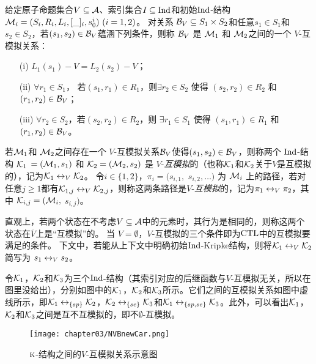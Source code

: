 \begin{definition}[$V$-互模拟]
	\label{def:VInd:bisimulation}
	给定原子命题集合$V\subseteq\cal A$、索引集合$I\subseteq \textrm{Ind}$和初始$\textrm{Ind}$-结构 ${\cal M}_i=(S_i, R_i,L_i, [\_]_i, s_0^i)~(i=1,2)$。
	对关系 ${\cal B}_V \subseteq S_1 \times S_2$和任意$s_1 \in S_1$和$s_2 \in S_2$，若$(s_1, s_2)\in {\cal B}_V$蕴涵下列条件，则称 ${\cal B}_V$ 是 ${\cal M}_1$ 和 ${\cal M}_2$之间的一个 $V$-互模拟关系：
	\begin{itemize}
		\item[(i)] $L_1(s_1) - V = L_2(s_2) -V$；
		\item[(ii)] $\forall r_1\in S_1$， 若$(s_1, r_1)\in R_1$，则$\exists r_2 \in S_2$ 使得 $(s_2,r_2) \in R_2$ 和 $(r_1, r_2) \in {\cal B}_V$；
		\item[(iii)] $\forall r_2\in S_2$，若$(s_2, r_2)\in R_2$，则 $\exists r_1 \in S_1$ 使得 $(s_1,r_1) \in R_1$ 和 $(r_1, r_2)\in {\cal B}_V$。
	\end{itemize}
\end{definition}


若${\cal M}_1$和 ${\cal M}_2$之间存在一个 $V$-互模拟关系${\cal B}_V$使得$(s_1, s_2)\in {\cal B}_V$，则称两个 $\textrm{Ind}$-结构 ${\cal K}_1$ $= ({\cal M}_1, s_1)$ 和 ${\cal K}_2 = ({\cal M}_2, s_2)$ 是 $V$-{\em 互模拟}的（也称${\cal K}_1$和${\cal K}_2$关于$V$是互模拟的），记为${\cal K}_1 \leftrightarrow_V {\cal K}_2$。
令$i\in \{1,2\}$，$\pi_i=(s_{i,1},$ $s_{i,2},\ldots)$ 为 ${\cal M}_i$ 上的路径，若对任意$j \ge 1$都有$ {\cal K}_{1,j} \leftrightarrow_V {\cal K}_{2,j}$，则称这两条路径是$V$-{\em 互模拟}的，记为$\pi_1 \leftrightarrow_V \pi_2$，其中 ${\cal K}_{i,j}=({\cal M}_i,$ $s_{i,j})$。


直观上，若两个状态在不考虑$V\subseteq\cal A$中的元素时，其行为是相同的，则称这两个状态在$\overline{V}$上是“互模拟”的。
当 $V=\emptyset$，$V$-互模拟的三个条件即为$\textrm{CTL}$中的互模拟要满足的条件。
下文中，若能从上下文中明确初始$\textrm{Ind}$-Kripke结构，则将${\cal K}_1 \leftrightarrow_V {\cal K}_2$ 简写为 $s_1 \leftrightarrow_V s_2$。

\begin{example}\label{exam:vB}
	令${\cal K}_1$，${\cal K}_2$和${\cal K}_3$为三个$\textrm{Ind}$-结构（其索引对应的后继函数与$V$-互模拟无关，所以在图里没给出），分别如图中的${\cal K}_1$，${\cal K}_2$和${\cal K}_3$所示。它们之间的互模拟关系如图中虚线所示，即${\cal K}_1 \leftrightarrow_{\{sp\}} {\cal K}_2$，${\cal K}_2 \leftrightarrow_{\{se\}} {\cal K}_3$和${\cal K}_1 \leftrightarrow_{\{sp,se\}} {\cal K}_3$。此外，可以看出${\cal K}_1$，${\cal K}_2$和${\cal K}_3$之间是互不互模拟\cite{Baier:PMC:2008}的，即不$\emptyset$-互模拟。
	\begin{figure*}[!htb]
		\centering
		\texttt{[image: chapter03/NVBnewCar.png]}\\
		\caption{$\textsc{k}$-结构之间的$V$-互模拟关系示意图}
		\label{Fig:chapter04:v1uv2}
	\end{figure*}
\end{example}



